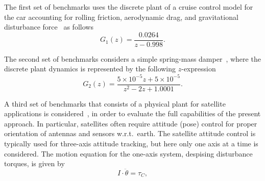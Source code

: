 \documentclass{sig-alternate-05-2015}
\begin{document}
The first set of benchmarks uses the discrete plant of a cruise control
model for the car accounting for rolling friction, aerodynamic drag, and
gravitational disturbance force~\cite{Astrom08} as follows
%
\begin{equation}
\label{cruise-control-c1}
G_1(z)=\frac{0.0264}{z-0.998}. \nonumber
\end{equation} 

%
%

The second set of benchmarks considers a simple spring-mass 
damper~\cite{DBLP:conf/hybrid/WangGRJF16}, where the discrete 
plant dynamics is represented by the following $z$-expression
%
%
\begin{equation}
\label{spring-mass-damper-g}
G_2(z)=\frac{5\times{10^{-5}}z + 5\times{10^{-5}}}{z^2 - 2z + 1.0001}. \nonumber
\end{equation} 
%

A third set of benchmarks that consists of a physical plant for satellite
applications is considered~\cite{Franklin15}, in order to evaluate the
full capabilities of the present approach.  In particular, satellites often require
attitude (pose) control for proper orientation of antennas and sensors
w.r.t.~earth.  The satellite attitude control is typically used for
three-axis attitude tracking, but here only one axis at a time is
considered.  The motion equation for the one-axis system, despising
disturbance torques, is given by
%
\begin{equation}
\label{eq:satelliteode}
I\cdot \ddot{\theta} = \tau_{C}, 
\end{equation}
\end{document}
